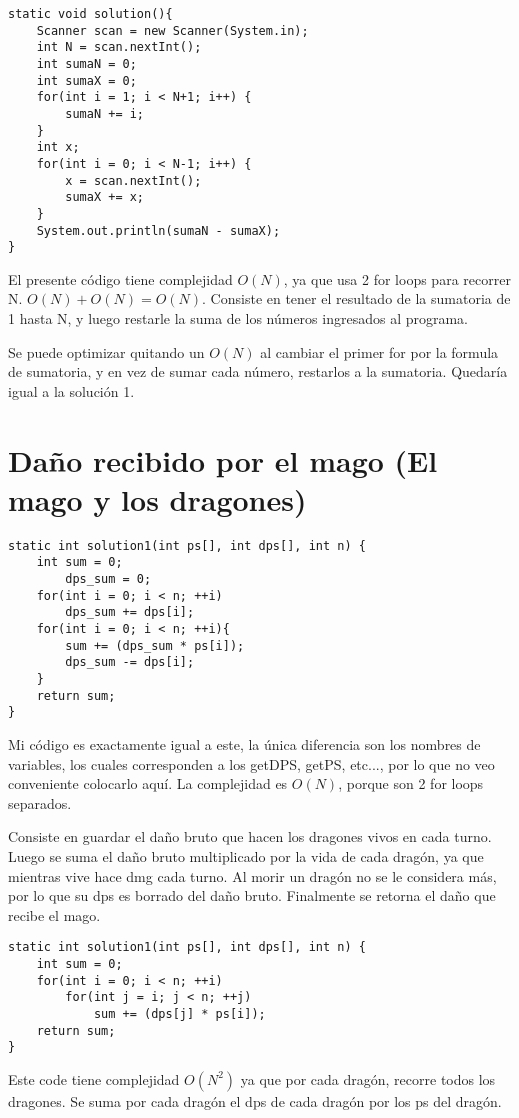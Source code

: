 \documentclass[a4paper,11pt]{article}
\theoremstyle{mytheor}
\begin{document}
\begin{lstlisting}[label={list:fourth},caption=Solución Diagnóstico.]
static void solution(){
	Scanner scan = new Scanner(System.in);
	int N = scan.nextInt();	
	int sumaN = 0;
	int sumaX = 0;
	for(int i = 1; i < N+1; i++) {
		sumaN += i;
	}
	int x;
	for(int i = 0; i < N-1; i++) {
		x = scan.nextInt();
		sumaX += x;
	}
	System.out.println(sumaN - sumaX);
}
\end{lstlisting}
El presente código tiene complejidad $O(N)$, ya que usa 2 for loops para recorrer N. 
$O(N) + O(N) = O(N)$. 
Consiste en tener el resultado de la sumatoria de 1 hasta N, y luego restarle la suma de los números ingresados al programa.

Se puede optimizar quitando un $O(N)$ al cambiar el primer for por la formula de sumatoria, y en vez de sumar cada número, restarlos a la sumatoria. Quedaría igual a la solución 1.

\pagebreak
\section*{Daño recibido por el mago (El mago y los dragones)}

\begin{lstlisting}[label={list:first},caption=Solución 1 y Diagnóstico.]
static int solution1(int ps[], int dps[], int n) {
	int sum = 0;
		dps_sum = 0;
	for(int i = 0; i < n; ++i)
		dps_sum += dps[i];
	for(int i = 0; i < n; ++i){
		sum += (dps_sum * ps[i]);
		dps_sum -= dps[i];
	}
	return sum;
}
\end{lstlisting}
Mi código es exactamente igual a este, la única diferencia son los nombres de variables, los cuales corresponden a los getDPS, getPS, etc..., por lo que no veo conveniente colocarlo aquí.
 La complejidad es $O(N)$, porque son 2 for loops separados.

Consiste en guardar el daño bruto que hacen los dragones vivos en cada turno. Luego se suma el daño bruto multiplicado por la vida de cada dragón, ya que mientras vive hace dmg cada turno. Al morir un dragón no se le considera más, por lo que su dps es borrado del daño bruto. Finalmente se retorna el daño que recibe el mago.



\begin{lstlisting}[label={list:second},caption=Solución 1.]
static int solution1(int ps[], int dps[], int n) {
	int sum = 0;
	for(int i = 0; i < n; ++i)
		for(int j = i; j < n; ++j)
			sum += (dps[j] * ps[i]);
	return sum;
}
\end{lstlisting}
Este code tiene complejidad $O(N^{2})$ ya que por cada dragón, recorre todos los dragones. Se suma por cada dragón el dps de cada dragón por los ps del dragón.
\end{document}
